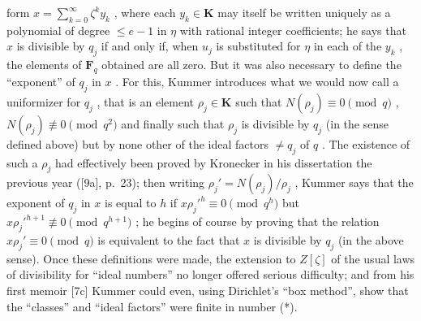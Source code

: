 form \(x = \sum_{k=0}^{\infty} \zeta^k y_k\) , where each \(y_k \in \mathbf{K}\) may itself be written uniquely as a polynomial of degree \(\leqslant e - 1\) in \(\eta\) with rational integer coefficients; he says that \(x\) is divisible by \(q_j\) if and only if, when \(u_j\) is substituted for \(\eta\) in each of the \(y_k\) , the elements of \(\mathbf{F}_q\) obtained are all zero. But it was also necessary to define the ``exponent'' of \(q_j\) in \(x\) . For this, Kummer introduces what we would now call a uniformizer for \(q_j\) , that is an element \(\rho_j \in \mathbf{K}\) such that \(N(\rho_j) \equiv 0 \pmod{q}\) , \(N(\rho_j) \not\equiv 0 \pmod{q^2}\) and finally such that \(\rho_j\) is divisible by \(q_j\) (in the sense defined above) but by none other of the ideal factors \(\neq q_j\) of \(q\) . The existence of such a \(\rho_j\) had effectively been proved by Kronecker in his dissertation the previous year ({[}9a{]}, p.~23); then writing \(\rho_j' = N(\rho_j)/\rho_j\) , Kummer says that the exponent of \(q_j\) in \(x\) is equal to \(h\) if \(x\rho_j'^h \equiv 0 \pmod{q^h}\) but \(x\rho_j'^{h+1} \not\equiv 0 \pmod{q^{h+1}}\) ; he begins of course by proving that the relation \(x\rho_j' \equiv 0 \pmod{q}\) is equivalent to the fact that \(x\) is divisible by \(q_j\) (in the above sense). Once these definitions were made, the extension to \(Z[\zeta]\) of the usual laws of divisibility for ``ideal numbers'' no longer offered serious difficulty; and from his first memoir {[}7c{]} Kummer could even, using Dirichlet's ``box method'', show that the ``classes'' and ``ideal factors'' were finite in number (*).

